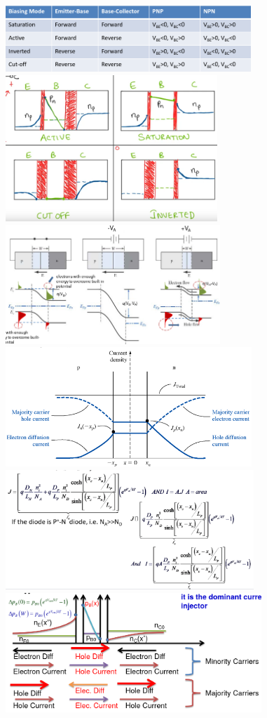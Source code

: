 \documentclass{article}
\begin{document}
\begin{center}
    \includegraphics[align=c, height=2.5cm]{bjtvolts.png}
    \includegraphics[align=c, height=5.5cm]{pnpcarriers.png}
    \includegraphics[align=c, height=4.5cm]{pnbias.png}
    \includegraphics[align=c, height=4.5cm]{pncurrent.png}
    \includegraphics[align=c, height=4.5cm]{narrowcurrent.png}
    \includegraphics[align=c, height=4.5cm]{pnpfwdcarriers.png}
\end{center}
\end{document}

